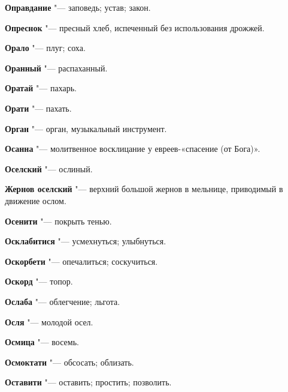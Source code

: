 \begin{mymulticols}{2}
\noindent\textbf{Оправдание} "--- заповедь; устав; закон. 




\noindent\textbf{Опреснок} "--- пресный хлеб, испеченный без использования дрожжей. 




\noindent\textbf{Орало} "--- плуг; соха. 




\noindent\textbf{Оранный} "--- распаханный. 




\noindent\textbf{Оратай} "--- пахарь. 




\noindent\textbf{Орати} "--- пахать. 




\noindent\textbf{Орган} "--- орган, музыкальный инструмент. 




\noindent\textbf{Осанна} "--- молитвенное восклицание у евреев-«спасение (от Бога)». 




\noindent\textbf{Оселский} "--- ослиный. 




\noindent\textbf{Жернов оселский} "--- верхний большой жернов в мельнице, приводимый в движение ослом. 




\noindent\textbf{Осенити} "--- покрыть тенью. 




\noindent\textbf{Осклабитися} "--- усмехнуться; улыбнуться. 




\noindent\textbf{Оскорбети} "--- опечалиться; соскучиться. 




\noindent\textbf{Оскорд} "--- топор. 




\noindent\textbf{Ослаба} "--- облегчение; льгота. 




\noindent\textbf{Осля} "--- молодой осел. 




\noindent\textbf{Осмица} "--- восемь. 




\noindent\textbf{Осмоктати} "--- обсосать; облизать. 




\noindent\textbf{Оставити} "--- оставить; простить; позволить. 





\end{mymulticols}
